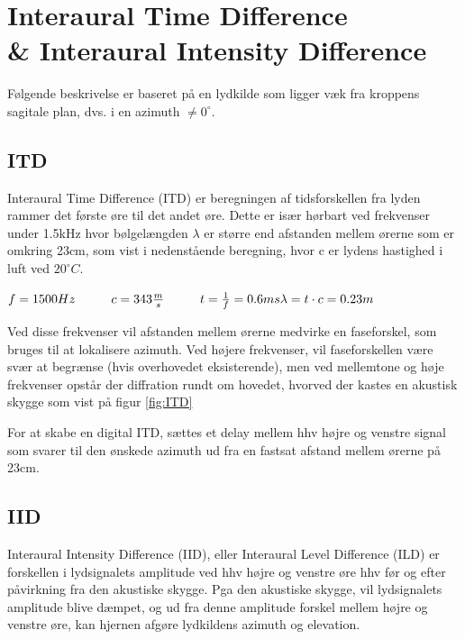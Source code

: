 \section{Interaural Time Difference\\ \& Interaural Intensity Difference}
\label{sec:ITD}
Følgende beskrivelse er baseret på en lydkilde som ligger væk fra kroppens sagitale plan, dvs. i en azimuth $ \ne 0^\circ$. 

\subsection{ITD}
Interaural Time Difference (ITD) er beregningen af tidsforskellen fra lyden rammer det første øre til det andet øre. Dette er især hørbart ved frekvenser under 1.5kHz hvor bølgelængden $\lambda$ er større end afstanden mellem ørerne som er omkring 23cm, som vist i nedenstående beregning, hvor c er lydens hastighed i luft ved $20^\circ C $.

\( f=1500Hz \hspace{1cm}  c=343\frac{m}{s} \hspace{1cm} t = \frac{1}{f} = 0.6ms  \\ \lambda = t \cdot c = 0.23m \)

Ved disse frekvenser vil afstanden mellem ørerne medvirke en faseforskel, som bruges til at lokalisere azimuth. Ved højere frekvenser, vil faseforskellen være svær at begrænse (hvis overhovedet eksisterende), men ved mellemtone og høje frekvenser opstår der diffration rundt om hovedet, hvorved der kastes en akustisk skygge som vist på figur \ref{fig:ITD}

For at skabe en digital ITD, sættes et delay mellem hhv højre og venstre signal som svarer til den ønskede azimuth ud fra en fastsat afstand mellem ørerne på 23cm.

\subsection{IID}

Interaural Intensity Difference (IID), eller Interaural Level Difference (ILD) er forskellen i lydsignalets amplitude ved hhv højre og venstre øre hhv før og efter påvirkning fra den akustiske skygge. Pga den akustiske skygge, vil lydsignalets amplitude blive dæmpet, og ud fra denne amplitude forskel mellem højre og venstre øre, kan hjernen afgøre lydkildens azimuth og elevation.

